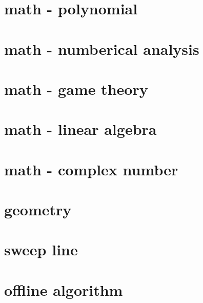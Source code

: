 \documentclass[UTF8, a4paper, titlepage, twoside]{ctexart}
\begin{document}
\section{math - polynomial}

\section{math - numberical analysis}

\section{math - game theory}

\section{math - linear algebra}

\section{math - complex number}

\section{geometry}

\section{sweep line}

\section{offline algorithm}
\end{document}
